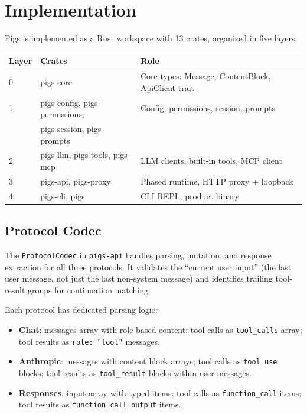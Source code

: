 \section{Implementation}
\label{sec:impl}

Pigs is implemented as a Rust workspace with 13 crates, organized in five layers:

\begin{center}
\begin{tabular}{lll}
\toprule
Layer & Crates & Role \\
\midrule
0 & pigs-core & Core types: Message, ContentBlock, ApiClient trait \\
1 & pigs-config, pigs-permissions, & Config, permissions, session, prompts \\
  & pigs-session, pigs-prompts & \\
2 & pigs-llm, pigs-tools, pigs-mcp & LLM clients, built-in tools, MCP client \\
3 & pigs-api, pigs-proxy & Phased runtime, HTTP proxy + loopback \\
4 & pigs-cli, pigs & CLI REPL, product binary \\
\bottomrule
\end{tabular}
\end{center}

\subsection{Protocol Codec}

The \texttt{ProtocolCodec} in \texttt{pigs-api} handles parsing, mutation, and response extraction for all three protocols. It validates the ``current user input'' (the last user message, not just the last non-system message) and identifies trailing tool-result groups for continuation matching.

Each protocol has dedicated parsing logic:
\begin{itemize}[nosep]
    \item \textbf{Chat}: messages array with role-based content; tool calls as \texttt{tool\_calls} array; tool results as \texttt{role: "tool"} messages.
    \item \textbf{Anthropic}: messages with content block arrays; tool calls as \texttt{tool\_use} blocks; tool results as \texttt{tool\_result} blocks within user messages.
    \item \textbf{Responses}: input array with typed items; tool calls as \texttt{function\_call} items; tool results as \texttt{function\_call\_output} items.
\end{itemize}

